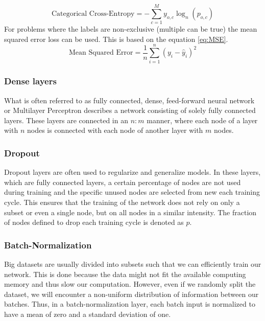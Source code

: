 \begin{equation}
\label{cce}
\text{Categorical Cross-Entropy} = -\sum_{c=1}^My_{o,c}\log_{n}(p_{o,c})
\end{equation}
For problems where the labels are non-exclusive (multiple can be true) the mean squared error loss can be used. This is based on the equation \ref{eq:MSE}.
 \begin{equation}
 \label{eq:MSE}
     \text{Mean Squared Error} = \frac{1}{n} \sum_{i=1}^{n} (y_i - \hat{y}_i)^2
 \end{equation}
 
\subsubsection{Dense layers}
What is often referred to as fully connected, dense, feed-forward neural network or Multilayer Perceptron describes a network consisting of solely fully connected layers. These layers are connected in an $n:m$ manner, where each node of a layer with $n$ nodes is connected with each node of another layer with $m$ nodes. 

\subsubsection{Dropout}
Dropout layers are often used to regularize and generalize models. In these layers, which are fully connected layers, a certain percentage of nodes are not used during training and the specific unused nodes are selected from new each training cycle. This ensures that the training of the network does not rely on only a subset or even a single node, but on all nodes in a similar intensity. The fraction of nodes defined to drop each training cycle is denoted as $p$.

\subsubsection{Batch-Normalization}
Big datasets are usually divided into subsets such that we can efficiently train our network. This is done because the data might not fit the available computing memory and thus slow our computation. However, even if we randomly split the dataset, we will encounter a non-uniform distribution of information between our batches. Thus, in a batch-normalization layer, each batch input is normalized to have a mean of zero and a standard deviation of one. 

